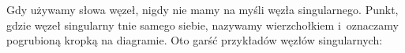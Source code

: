 Gdy używamy słowa węzeł, nigdy nie mamy na myśli węzła singularnego.
Punkt, gdzie węzeł singularny tnie samego siebie, nazywamy wierzchołkiem i~oznaczamy pogrubioną kropką na diagramie.
Oto garść przykładów węzłów singularnych:

